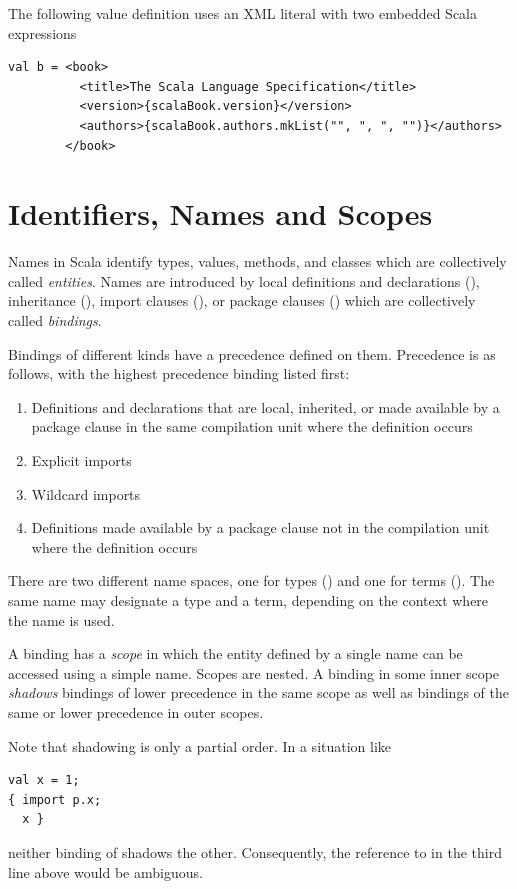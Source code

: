 \example 
The following value definition uses an XML literal with two embedded
Scala expressions
\begin{lstlisting}
val b = <book>
          <title>The Scala Language Specification</title>
          <version>{scalaBook.version}</version>
          <authors>{scalaBook.authors.mkList("", ", ", "")}</authors>
        </book>
\end{lstlisting}

\chapter{\label{sec:names}Identifiers, Names and Scopes}

Names in Scala identify types, values, methods, and classes which are
collectively called {\em entities}. Names are introduced by local
definitions and declarations (), inheritance (),
import clauses (), or package clauses
() which are collectively called {\em
bindings}.

Bindings of different kinds have a precedence defined on them.  Precedence 
 is as follows, with the highest precedence binding listed first: 
\begin{enumerate} 
\item Definitions and declarations that are local, inherited, or made 
available by a package clause in the same compilation unit where the 
definition occurs 
\item Explicit imports 
\item Wildcard imports 
\item Definitions made available by a package clause not in the 
compilation unit where the definition occurs 
\end{enumerate} 

There are two different name spaces, one for types ()
and one for terms ().  The same name may designate a
type and a term, depending on the context where the name is used.

A binding has a {\em scope} in which the entity defined by a single
name can be accessed using a simple name. Scopes are nested.  A binding
in some inner scope {\em shadows} bindings of lower precedence in the
same scope as well as bindings of the same or lower precedence in outer
scopes. 

Note that shadowing is only a partial order. In a situation like
\begin{lstlisting}
val x = 1;
{ import p.x; 
  x }
\end{lstlisting}
neither binding of  shadows the other. Consequently, the
reference to  in the third line above would be ambiguous.

